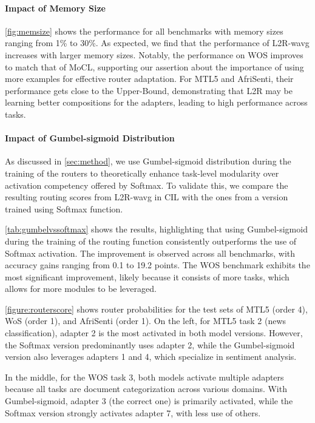 \documentclass[11pt]{article}
\begin{document}
\paragraph{Impact of Memory Size} 

\autoref{fig:memsize} shows the performance for all benchmarks with memory sizes ranging from 1\% to 30\%. As expected, we find that the performance of L2R-wavg increases with larger memory sizes. Notably, the performance on WOS improves to match that of MoCL, supporting our assertion about the importance of using more examples for effective router adaptation.
For MTL5 and AfriSenti, their performance gets close to the Upper-Bound, demonstrating that L2R may be learning better compositions for the adapters, leading to high performance across tasks.

\paragraph{Impact of Gumbel-sigmoid Distribution} 
As discussed in \autoref{sec:method}, we use Gumbel-sigmoid distribution during the training of the routers to theoretically enhance task-level modularity over activation competency offered by Softmax. To validate this, we compare the resulting routing scores from L2R-wavg in CIL with the ones from a version trained using Softmax function.

\autoref{tab:gumbelvssoftmax} shows the results, highlighting that using Gumbel-sigmoid during the training of the routing function consistently outperforms the use of Softmax activation. The improvement is observed across all benchmarks, with accuracy gains ranging from 0.1 to 19.2 points. The WOS benchmark exhibits the most significant improvement, likely because it consists of more tasks, which allows for more modules to be leveraged.

\autoref{figure:routerscore} shows router probabilities for the test sets of MTL5 (order 4), WoS (order 1), and AfriSenti (order 1). On the left, for MTL5 task 2 (news classification), adapter 2 is the most activated in both model versions. However, the Softmax version predominantly uses adapter 2, while the Gumbel-sigmoid version also leverages adapters 1 and 4, which specialize in sentiment analysis.

In the middle, for the WOS task 3, both models activate multiple adapters because all tasks are document categorization across various domains. With Gumbel-sigmoid, adapter 3 (the correct one) is primarily activated, while the Softmax version strongly activates adapter 7, with less use of others.
\end{document}
